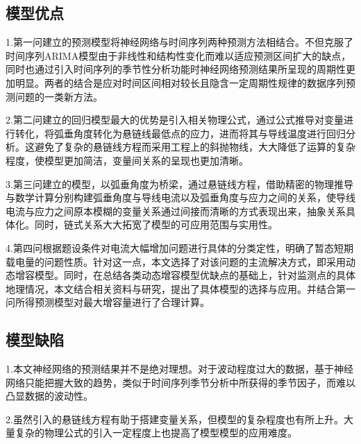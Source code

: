 \documentclass[a4paper,12.045pt]{ctexart}
\begin{document}
	\subsection{模型优点}
	1.第一问建立的预测模型将神经网络与时间序列两种预测方法相结合。不但克服了时间序列ARIMA模型由于非线性和结构性变化而难以适应预测区间扩大的缺点，同时也通过引入时间序列的季节性分析功能时神经网络预测结果所呈现的周期性更加明显。两者的结合是应对时间区间相对较长且隐含一定周期性规律的数据序列预测问题的一类新方法。
	\par
	2.第二问建立的回归模型最大的优势是引入相关物理公式，通过公式推导对变量进行转化，将弧垂角度转化为悬链线最低点的应力，进而将其与导线温度进行回归分析。这避免了复杂的悬链线方程而采用工程上的斜抛物线，大大降低了运算的复杂程度，使模型更加简洁，变量间关系的呈现也更加清晰。
	\par
	3.第三问建立的模型，以弧垂角度为桥梁，通过悬链线方程，借助精密的物理推导与数学计算分别构建弧垂角度与导线电流以及弧垂角度与应力之间的关系，使导线电流与应力之间原本模糊的变量关系通过间接而清晰的方式表现出来，抽象关系具体化。同时，链式关系大大拓宽了模型的可应用范围与实用性。
	\par
	4.第四问根据题设条件对电流大幅增加问题进行具体的分类定性，明确了暂态短期载电量的问题性质。针对这一点，本文选择了对该问题的主流解决方式，即采用动态增容模型。同时，在总结各类动态增容模型优缺点的基础上，针对监测点的具体地理情况，本文结合相关资料与研究，提出了具体模型的选择与应用。并结合第一问所得预测模型对最大增容量进行了合理计算。
	\subsection{模型缺陷}
	1.本文神经网络的预测结果并不是绝对理想。对于波动程度过大的数据，基于神经网络只能把握大致的趋势，类似于时间序列季节分析中所获得的季节因子，而难以凸显数据的波动性。
	\par
	2.虽然引入的悬链线方程有助于搭建变量关系，但模型的复杂程度也有所上升。大量复杂的物理公式的引入一定程度上也提高了模型模型的应用难度。
\end{document}
